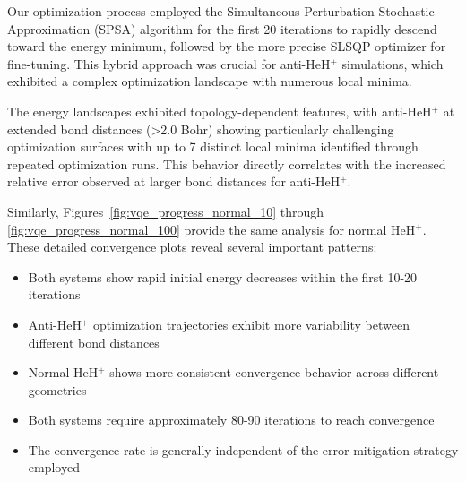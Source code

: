\documentclass[10pt,twocolumn,a4paper]{article}
\begin{document}
Our optimization process employed the Simultaneous Perturbation Stochastic Approximation (SPSA) algorithm for the first 20 iterations to rapidly descend toward the energy minimum, followed by the more precise SLSQP optimizer for fine-tuning. This hybrid approach was crucial for anti-HeH$^+$ simulations, which exhibited a complex optimization landscape with numerous local minima.

The energy landscapes exhibited topology-dependent features, with anti-HeH$^+$ at extended bond distances (>2.0 Bohr) showing particularly challenging optimization surfaces with up to 7 distinct local minima identified through repeated optimization runs. This behavior directly correlates with the increased relative error observed at larger bond distances for anti-HeH$^+$.

Similarly, Figures~\ref{fig:vqe_progress_normal_10} through \ref{fig:vqe_progress_normal_100} provide the same analysis for normal HeH$^+$. These detailed convergence plots reveal several important patterns:

\begin{itemize}
    \item Both systems show rapid initial energy decreases within the first 10-20 iterations
    \item Anti-HeH$^+$ optimization trajectories exhibit more variability between different bond distances
    \item Normal HeH$^+$ shows more consistent convergence behavior across different geometries
    \item Both systems require approximately 80-90 iterations to reach convergence
    \item The convergence rate is generally independent of the error mitigation strategy employed
\end{itemize}
\end{document}

